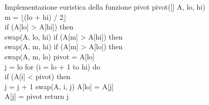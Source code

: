 \begin{minicode}{Implementazione euristica della funzione pivot}
\ind{} pivot([] A,  lo,  hi)\\
     m = $\lfloor$(lo + hi) / 2$\rfloor$\\
    \indf if (A[lo] > A[hi]) then\\
        swap(A, lo, hi)\hfill{}
    \indf if (A[m] > A[hi]) then\\
        swap(A, m, hi)\hfill{}
    \indf if (A[m] > A[lo]) then\\
        swap(A, m, lo)\hfill{}
    \indf {} pivot = A[lo]\\
    \indf{} j = lo\hfill{}
    \indf for (i = lo + 1 to hi) do\\
        \indff if (A[i] < pivot) then\\
            j = j + 1\hfill{}
            swap(A, i, j)\hfill{}
    \indf A[lo] = A[j]\\
    \indf A[j] = pivot\hfill{}
    \indf return j\\
\end{minicode}

